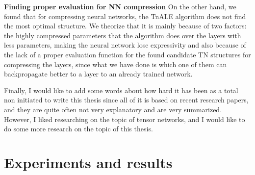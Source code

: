 \documentclass[11pt,a4paper,openright,oneside]{book}
\numberwithin{equation}{section}
\begin{document}
{\textbf{Finding proper evaluation for NN compression} On the other hand, we found that for compressing neural networks, the TnALE algorithm does not find the most optimal
structure. We theorize that it is mainly because of two factors: the highly compressed parameters that the algorithm does
over the layers with less parameters, making the neural network lose expressivity and also because of the 
lack of a proper evaluation function for the found candidate TN structures for compressing the layers, since
what we have done is which one of them can backpropagate better to a layer to an already trained network.

Finally, I would like to add some words about how hard it has been 
as a total non initiated to write this thesis since all of it is based
on recent research papers, and they are quite often not very explanatory and
are very summarized. However, I liked researching on the topic of tensor networks, and I would like
to do some more research on the topic of this thesis.

\normalfont


\newpage

\printbibliography

\appendix
\chapter{Experiments and results}

}
\end{document}
